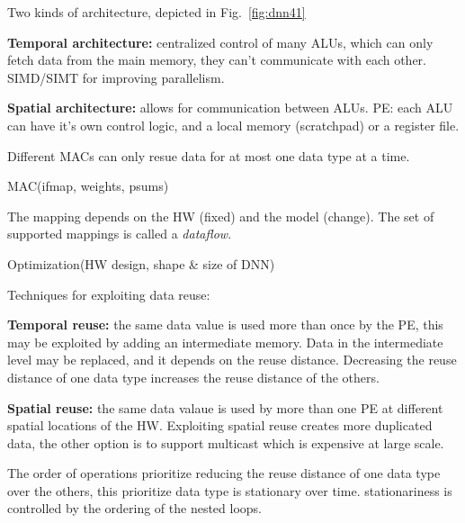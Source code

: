 \begin{dashlist}
    \item Two kinds of architecture, depicted in Fig.~\ref{fig:dnn41}
    \begin{dashlist}
        \item \textbf{Temporal architecture:} centralized control of many ALUs, which can only fetch data from the main memory, they can't communicate with each other. SIMD/SIMT for improving parallelism.
        \item \textbf{Spatial architecture:} allows for communication between ALUs. PE: each ALU can have it's own control logic, and a local memory (scratchpad) or a register file.
    \end{dashlist}

    \item  Different MACs can only resue data for at most one data type at a time.
    \begin{center}
        MAC(ifmap, weights, psums)
    \end{center}
    
    \item The mapping depends on the HW (fixed) and the model (change). The set of supported mappings is called a \textit{dataflow}.
    \begin{center}
        Optimization(HW design, shape \& size of DNN)
    \end{center} 
    

    \item Techniques for exploiting data reuse: 
    \begin{dashlist}
        \item \textbf{Temporal reuse:} the same data value is used more than once by the PE, this may be exploited by adding an intermediate memory. Data in the intermediate level may be replaced, and it depends on the reuse distance. Decreasing the reuse distance of one data type increases the reuse distance of the others.
        \item \textbf{Spatial reuse:} the same data valaue is used by more than one PE at different spatial locations of the HW. Exploiting spatial reuse creates more duplicated data, the other option is to support multicast which is expensive at large scale. 
    \end{dashlist}
    
    \item The order of operations prioritize reducing the reuse distance of one data type over the others, this prioritize data type is stationary over time. stationariness is controlled by the ordering of the nested loops.
    

\end{dashlist}
